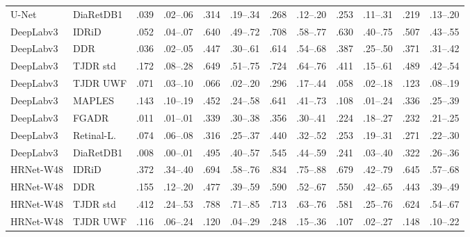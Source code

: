 \begin{landscape}
{\begin{longtable}{l l c c c c c c c c c c}
U-Net & DiaRetDB1 & .039 & \scriptsize .02--.06 & .314 & \scriptsize .19--.34 & .268 & \scriptsize .12--.20 & .253 & \scriptsize .11--.31 & .219 & \scriptsize .13--.20 \\
DeepLabv3 & IDRiD & .052 & \scriptsize .04--.07 & .640 & \scriptsize .49--.72 & .708 & \scriptsize .58--.77 & .630 & \scriptsize .40--.75 & .507 & \scriptsize .43--.55 \\
DeepLabv3 & DDR & .036 & \scriptsize .02--.05 & .447 & \scriptsize .30--.61 & .614 & \scriptsize .54--.68 & .387 & \scriptsize .25--.50 & .371 & \scriptsize .31--.42 \\
DeepLabv3 & TJDR std & .172 & \scriptsize .08--.28 & .649 & \scriptsize .51--.75 & .724 & \scriptsize .64--.76 & .411 & \scriptsize .15--.61 & .489 & \scriptsize .42--.54 \\
DeepLabv3 & TJDR UWF & .071 & \scriptsize .03--.10 & .066 & \scriptsize .02--.20 & .296 & \scriptsize .17--.44 & .058 & \scriptsize .02--.18 & .123 & \scriptsize .08--.19 \\
DeepLabv3 & MAPLES & .143 & \scriptsize .10--.19 & .452 & \scriptsize .24--.58 & .641 & \scriptsize .41--.73 & .108 & \scriptsize .01--.24 & .336 & \scriptsize .25--.39 \\
DeepLabv3 & FGADR & .011 & \scriptsize .01--.01 & .339 & \scriptsize .30--.38 & .356 & \scriptsize .30--.41 & .224 & \scriptsize .18--.27 & .232 & \scriptsize .21--.25 \\
DeepLabv3 & Retinal-L. & .074 & \scriptsize .06--.08 & .316 & \scriptsize .25--.37 & .440 & \scriptsize .32--.52 & .253 & \scriptsize .19--.31 & .271 & \scriptsize .22--.30 \\
DeepLabv3 & DiaRetDB1 & .008 & \scriptsize .00--.01 & .495 & \scriptsize .40--.57 & .545 & \scriptsize .44--.59 & .241 & \scriptsize .03--.40 & .322 & \scriptsize .26--.36 \\
HRNet-W48 & IDRiD & .372 & \scriptsize .34--.40 & .694 & \scriptsize .58--.76 & .834 & \scriptsize .75--.88 & .679 & \scriptsize .42--.79 & .645 & \scriptsize .57--.68 \\
HRNet-W48 & DDR & .155 & \scriptsize .12--.20 & .477 & \scriptsize .39--.59 & .590 & \scriptsize .52--.67 & .550 & \scriptsize .42--.65 & .443 & \scriptsize .39--.49 \\
HRNet-W48 & TJDR std & .412 & \scriptsize .24--.53 & .788 & \scriptsize .71--.85 & .713 & \scriptsize .63--.76 & .581 & \scriptsize .25--.76 & .624 & \scriptsize .54--.67 \\
HRNet-W48 & TJDR UWF & .116 & \scriptsize .06--.24 & .120 & \scriptsize .04--.29 & .248 & \scriptsize .15--.36 & .107 & \scriptsize .02--.27 & .148 & \scriptsize .10--.22 \\

\end{longtable}}
\end{landscape}
